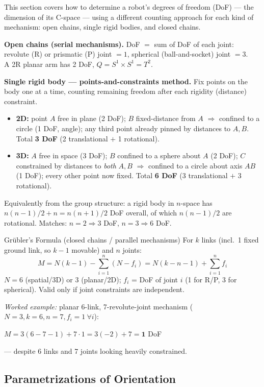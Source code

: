This section covers how to determine a robot's degrees of freedom (DoF) --- the dimension of its C-space --- using a different counting approach for each kind of mechanism: open chains, single rigid bodies, and closed chains.

\textbf{Open chains (serial mechanisms).} DoF $=$ sum of DoF of each joint: revolute (R) or prismatic (P) joint $=1$, spherical (ball-and-socket) joint $=3$. \\
A 2R planar arm has 2 DoF, $Q=S^1\times S^1=T^2$.

\textbf{Single rigid body --- points-and-constraints method.} Fix points on the body one at a time, counting remaining freedom after each rigidity (distance) constraint.
\begin{itemize}
\item \textbf{2D:} point $A$ free in plane (2 DoF); $B$ fixed-distance from $A$ $\Rightarrow$ confined to a circle (1 DoF, angle); any third point already pinned by distances to $A,B$. Total \textbf{3 DoF} (2 translational $+$ 1 rotational).
\item \textbf{3D:} $A$ free in space (3 DoF); $B$ confined to a sphere about $A$ (2 DoF); $C$ constrained by distances to \emph{both} $A,B$ $\Rightarrow$ confined to a circle about axis $AB$ (1 DoF); every other point now fixed. Total \textbf{6 DoF} (3 translational $+$ 3 rotational).
\end{itemize}
Equivalently from the group structure: a rigid body in $n$-space has $n(n-1)/2+n=n(n+1)/2$ DoF overall, of which $n(n-1)/2$ are rotational. Matches: $n=2\Rightarrow 3$ DoF, $n=3\Rightarrow 6$ DoF.

\begin{defbox}{Grübler's Formula (closed chains / parallel mechanisms)}
For $k$ links (incl.\ 1 fixed ground link, so $k-1$ movable) and $n$ joints:
\[
M = N(k-1) - \sum_{i=1}^{n} (N-f_i) = N(k-n-1) + \sum_{i=1}^{n} f_i
\]
$N=6$ (spatial/3D) or $3$ (planar/2D); $f_i$ = DoF of joint $i$ (1 for R/P, 3 for spherical). Valid only if joint constraints are independent.
\end{defbox}
\textit{Worked example:} planar 6-link, 7-revolute-joint mechanism ($N=3,k=6,n=7,f_i=1\ \forall i$):

$M=3(6-7-1)+7\cdot1=3(-2)+7=\mathbf{1}$ DoF

--- despite 6 links and 7 joints looking heavily constrained.

\subsection{Parametrizations of Orientation}

